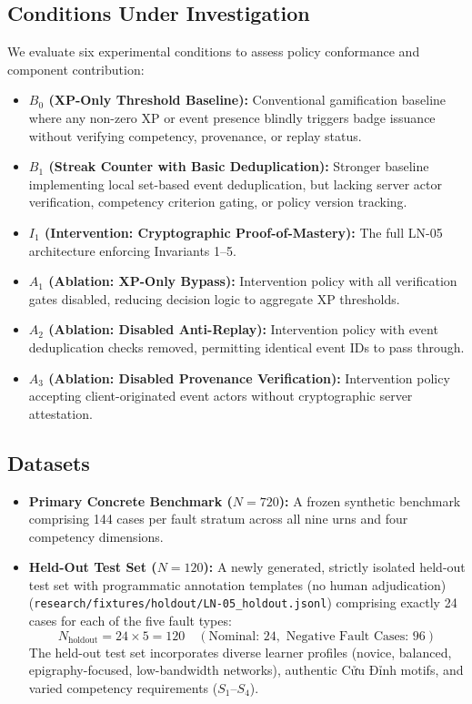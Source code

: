 \documentclass[11pt,a4paper]{article}
\begin{document}
\subsection{Conditions Under Investigation}
We evaluate six experimental conditions to assess policy conformance and component contribution:
\begin{itemize}[leftmargin=*]
    \item \textbf{$B_0$ (XP-Only Threshold Baseline):} Conventional gamification baseline where any non-zero XP or event presence blindly triggers badge issuance without verifying competency, provenance, or replay status.
    \item \textbf{$B_1$ (Streak Counter with Basic Deduplication):} Stronger baseline implementing local set-based event deduplication, but lacking server actor verification, competency criterion gating, or policy version tracking.
    \item \textbf{$I_1$ (Intervention: Cryptographic Proof-of-Mastery):} The full LN-05 architecture enforcing Invariants 1--5.
    \item \textbf{$A_1$ (Ablation: XP-Only Bypass):} Intervention policy with all verification gates disabled, reducing decision logic to aggregate XP thresholds.
    \item \textbf{$A_2$ (Ablation: Disabled Anti-Replay):} Intervention policy with event deduplication checks removed, permitting identical event IDs to pass through.
    \item \textbf{$A_3$ (Ablation: Disabled Provenance Verification):} Intervention policy accepting client-originated event actors without cryptographic server attestation.
\end{itemize}

\subsection{Datasets}
\begin{itemize}[leftmargin=*]
    \item \textbf{Primary Concrete Benchmark ($N = 720$):} A frozen synthetic benchmark comprising 144 cases per fault stratum across all nine urns and four competency dimensions.
    \item \textbf{Held-Out Test Set ($N = 120$):} A newly generated, strictly isolated held-out test set with programmatic annotation templates (no human adjudication) (\texttt{research/fixtures/holdout/LN-05\_holdout.jsonl}) comprising exactly 24 cases for each of the five fault types:
    \begin{equation}
    N_{\text{holdout}} = 24 \times 5 = 120 \quad (\text{Nominal: } 24, \text{ Negative Fault Cases: } 96)
    \end{equation}
    The held-out test set incorporates diverse learner profiles (novice, balanced, epigraphy-focused, low-bandwidth networks), authentic Cửu Đỉnh motifs, and varied competency requirements ($S_1$--$S_4$).
\end{itemize}
\end{document}
